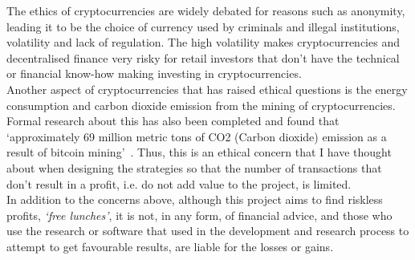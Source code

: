 The ethics of cryptocurrencies are widely debated for reasons such as anonymity, leading it to be the choice of currency used by criminals and illegal institutions, volatility and lack of regulation. The high volatility makes cryptocurrencies and decentralised finance very risky for retail investors that don't have the technical or financial know-how making investing in cryptocurrencies.
\\[5mm]
Another aspect of cryptocurrencies that has raised ethical questions is the energy consumption and carbon dioxide emission from the mining of cryptocurrencies. Formal research about this has also been completed and found that `approximately 69 million metric tons of CO2 (Carbon dioxide) emission as a result of bitcoin mining'~\cite{egiyi2020cryptocurrency}. Thus, this is an ethical concern that I have thought about when designing the strategies so that the number of transactions that don't result in a profit, i.e. do not add value to the project, is limited.
\\[5mm]
In addition to the concerns above, although this project aims to find riskless profits, \textit{`free lunches'}, it is not, in any form, of financial advice, and those who use the research or software that used in the development and research process to attempt to get favourable results, are liable for the losses or gains. 
